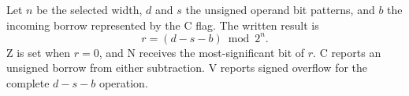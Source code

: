Let \(n\) be the selected width, \(d\) and \(s\) the unsigned operand bit patterns, and \(b\) the incoming borrow represented by the C flag. The written result is
\[
  r = (d - s - b) \bmod 2^n .
\]
Z is set when \(r=0\), and N receives the most-significant bit of \(r\). C reports an unsigned borrow from either subtraction. V reports signed overflow for the complete \(d-s-b\) operation.
